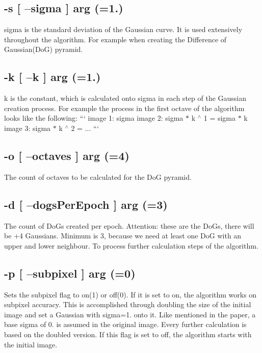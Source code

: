\subsection*{-\/s \mbox{[} --sigma \mbox{]} arg (=1.)}

sigma is the standard deviation of the Gaussian curve. It is used extensively throughout the algorithm. For example when creating the Difference of Gaussian(\+Do\+G) pyramid.

\subsection*{-\/k \mbox{[} --k \mbox{]} arg (=1.)}

k is the constant, which is calculated onto sigma in each step of the Gaussian creation process. For example the process in the first octave of the algorithm looks like the following\+: ``` image 1\+: sigma image 2\+: sigma $\ast$ k $^\wedge$ 1 = sigma $\ast$ k image 3\+: sigma $\ast$ k $^\wedge$ 2 = ... ```

\subsection*{-\/o \mbox{[} --octaves \mbox{]} arg (=4)}

The count of octaves to be calculated for the Do\+G pyramid.

\subsection*{-\/d \mbox{[} --dogs\+Per\+Epoch \mbox{]} arg (=3)}

The count of Do\+Gs created per epoch. Attention\+: these are the Do\+Gs, there will be +4 Gaussians. Minimum is 3, because we need at least one Do\+G with an upper and lower neighbour. To process further calculation steps of the algorithm.

\subsection*{-\/p \mbox{[} --subpixel \mbox{]} arg (=0)}

Sets the subpixel flag to on(1) or off(0). If it is set to on, the algorithm works on subpixel accuracy. This is accomplished through doubling the size of the initial image and set a Gaussian with sigma=1. onto it. Like mentioned in the paper, a base sigma of 0. is assumed in the original image. Every further calculation is based on the doubled version. If this flag is set to off, the algorithm starts with the initial image. 